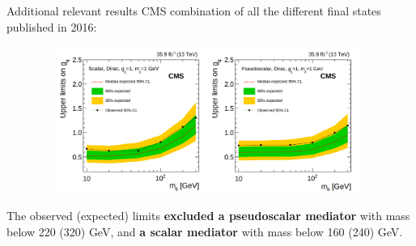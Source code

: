 \documentclass[8pt]{beamer}
\begin{document}
\begin{frame}{Additional relevant results}
\justifying
CMS combination of all the different final states published in 2016:

\begin{figure}[htbp]
\begin{center}
\includegraphics[width=11cm, height=4.8cm]{figs/CMSttbarExclusion.png}
\end{center}
\end{figure} \vfill

The observed (expected) limits \textbf{excluded a pseudoscalar mediator} with mass below 220 (320) GeV, and \textbf{a scalar mediator} with mass below 160 (240) GeV. \vfill
\end{frame}
\end{document}
